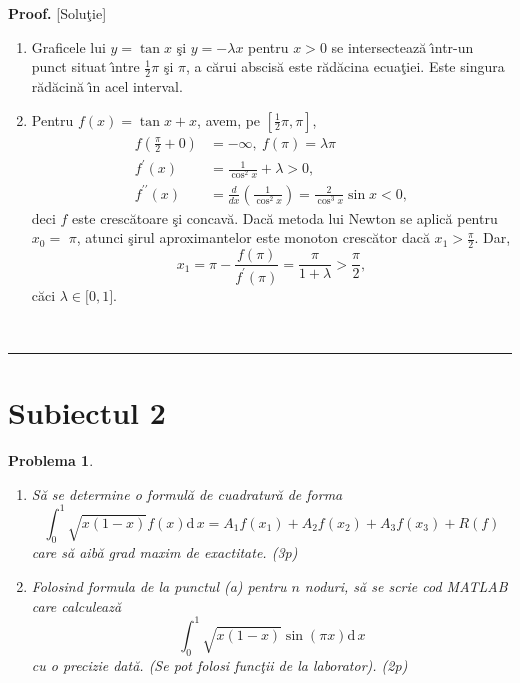 \documentclass[12pt]{article}%
\newtheorem{problem}[theorem]{Problema}
\newenvironment{proof}[1][Proof]{\noindent\textbf{#1.} }{\ \rule{0.5em}{0.5em}}
\begin{document}
\begin{proof}
[Solu\c{t}ie]

\begin{enumerate}
\item[(a)] Graficele lui $y=\tan x$ \c{s}i $y=-\lambda x$ pentru $x>0$ se
intersecteaz\u{a} \^{\i}ntr-un punct situat \^{\i}ntre $\frac{1}{2}\pi$ \c{s}i
$\pi$, a c\u{a}rui abscis\u{a} este r\u{a}d\u{a}cina ecua\c{t}iei. Este
singura r\u{a}d\u{a}cin\u{a} \^{\i}n acel interval.

\item[(b)] Pentru $f(x)=\tan x+x$, avem, pe $\left[  \frac{1}{2}\pi
,\pi\right]  $,%
\begin{align*}
f\left(  \frac{\pi}{2}+0\right)   &  =-\infty,~f\left(  \pi\right)
=\lambda\pi\\
f^{\prime}\left(  x\right)   &  =\frac{1}{\cos^{2}x}+\lambda>0,\\
f^{\prime\prime}(x) &  =\frac{d}{dx}\left(  \frac{1}{\cos^{2}x}\right)
=\frac{2}{\cos^{3}x}\sin x<0,
\end{align*}
deci  $f$ este cresc\u{a}toare \c{s}i concav\u{a}. Dac\u{a} metoda lui Newton
se aplic\u{a} pentru  $x_{0}=$ $\pi$, atunci \c{s}irul aproximantelor este
monoton cresc\u{a}tor dac\u{a} $x_{1}>\frac{\pi}{2}$. Dar,
\[
x_{1}=\pi-\frac{f\left(  \pi\right)  }{f^{\prime}\left(  \pi\right)  }%
=\frac{\pi}{1+\lambda}>\frac{\pi}{2},
\]
c\u{a}ci $\lambda\in\lbrack0,1]$.
\end{enumerate}
\end{proof}

\newpage

\section{Subiectul 2}

\begin{problem}


\begin{enumerate}
\item[(a)] S\u{a} se determine o formul\u{a} de cuadratur\u{a} de forma%
\[
\int_{0}^{1}\sqrt{x(1-x)}f(x)\mathrm{d}\,x=A_{1}f(x_{1})+A_{2}f(x_{2}%
)+A_{3}f(x_{3})+R(f)
\]
care s\u{a} aib\u{a} grad maxim de exactitate. (3p)

\item[(b)] Folosind formula de la punctul (a) pentru $n$ noduri, s\u{a} se
scrie cod MATLAB care calculeaz\u{a}%
\[
\int_{0}^{1}\sqrt{x(1-x)}\sin(\pi x)\mathrm{d}\,x
\]
cu o precizie dat\u{a}. (Se pot folosi func\c{t}ii de la laborator). (2p)
\end{enumerate}
\end{problem}
\end{document}
